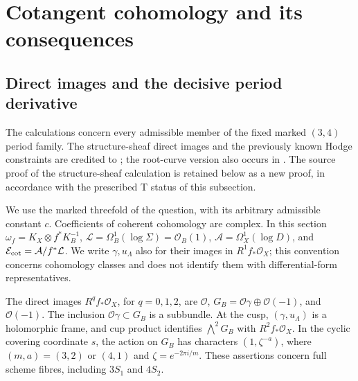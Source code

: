 \section{Cotangent cohomology and its consequences}\label{sec:cohomology}
\subsection{Direct images and the decisive period derivative}\label{sec:cotangent-images}
The calculations concern every admissible member of the fixed marked
$(3,4)$ period family.  The structure-sheaf direct images and the previously
known Hodge constraints are credited to \cite[Proposition 9.13 and Theorem 9.1]{AC26};
the root-curve version also occurs in \cite[Proposition 6.10]{DGKXv1}.
The source proof of the structure-sheaf calculation is retained below as a
new proof, in accordance with the prescribed T status of this subsection.


\begin{definition}\label{inv:notation-cotangent}
We use the marked threefold of the question, with its arbitrary admissible
constant $c$.  Coefficients of coherent cohomology are complex.  In this
section $\omega_f=K_X\otimes f^*K_B^{-1}$,
$\mathcal L=\Omega_B^1(\log\Sigma)=\mathcal O_B(1)$,
$\mathcal A=\Omega_X^1(\log D)$, and
$\mathcal E_{\rm cot}=\mathcal A/f^*\mathcal L$.  We write $\gamma,u_{\Lambda}$ also for
their images in $R^1f_*\mathcal O_X$; this convention concerns cohomology
classes and does not identify them with differential-form representatives.
\end{definition}

\begin{theorem}\label{inv:A1.0}
The direct images $R^qf_*\mathcal O_X$, for $q=0,1,2$, are
$\mathcal O$, $G_B=\mathcal O\gamma\oplus\mathcal O(-1)$, and $\mathcal O(-1)$.
The inclusion $\mathcal O\gamma\subset G_B$ is a subbundle.  At the cusp,
$(\gamma,u_{\Lambda})$ is a holomorphic frame, and cup product identifies
$\bigwedge^2G_B$ with $R^2f_*\mathcal O_X$.  In the cyclic covering coordinate
$s$, the action on $G_B$ has characters $(1,\zeta^{-a})$, where
$(m,a)=(3,2)$ or $(4,1)$ and $\zeta=e^{-2\pi i/m}$.
These assertions concern full scheme fibres, including $3S_1$ and $4S_2$.
\end{theorem}

